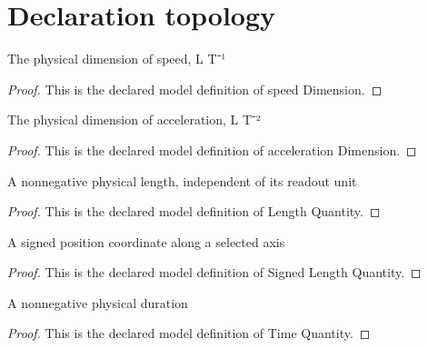\section{Declaration topology}
\begin{definition}
  \label{def:physics:phyx-mini-0739:phyxminiproblems-problemphyxmini0739-speeddimension}
  The physical dimension of speed, L T⁻¹
\end{definition}
\begin{proof}
  This is the declared model definition of speed Dimension.
\end{proof}
\begin{definition}
  \label{def:physics:phyx-mini-0739:phyxminiproblems-problemphyxmini0739-accelerationdimension}
  The physical dimension of acceleration, L T⁻²
\end{definition}
\begin{proof}
  This is the declared model definition of acceleration Dimension.
\end{proof}
\begin{definition}
  \label{def:physics:phyx-mini-0739:phyxminiproblems-problemphyxmini0739-lengthquantity}
  A nonnegative physical length, independent of its readout unit
\end{definition}
\begin{proof}
  This is the declared model definition of Length Quantity.
\end{proof}
\begin{definition}
  \label{def:physics:phyx-mini-0739:phyxminiproblems-problemphyxmini0739-signedlengthquantity}
  A signed position coordinate along a selected axis
\end{definition}
\begin{proof}
  This is the declared model definition of Signed Length Quantity.
\end{proof}
\begin{definition}
  \label{def:physics:phyx-mini-0739:phyxminiproblems-problemphyxmini0739-timequantity}
  A nonnegative physical duration
\end{definition}
\begin{proof}
  This is the declared model definition of Time Quantity.
\end{proof}
